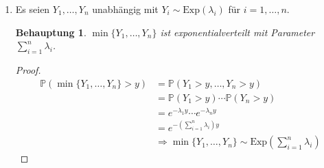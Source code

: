\documentclass[a4paper]{scrartcl}
\newtheorem*{behaupt}{Behauptung}
\newcommand{\prob}{\mathbb{P}}
\def \blattnr {4}
\begin{document}
\begin{enumerate}[label=\bfseries \blattnr.\arabic*]
\begin{enumerate}
            \item
                Es seien $Y_1, \dotsc, Y_n$ unabhängig mit $Y_i \sim
                \text{Exp}(\lambda_i)$ für $i = 1, \dotsc, n$.
                \begin{behaupt}
                    $\min\{Y_1, \dotsc, Y_n\}$ ist exponentialverteilt mit
                    Parameter $\sum_{i=1}^n \lambda_i$.
                \end{behaupt}
                \begin{proof}
                    \begin{equation*}
                        \begin{split}
                            \prob(\min\{Y_1, \dotsc, Y_n\} > y)
                            &= \prob(Y_1 > y, \dotsc, Y_n > y) \\
                            &= \prob(Y_1 > y) \dotsm \prob(Y_n > y) \\
                            &= e^{-\lambda_1 y} \dotsm e^{-\lambda_n y} \\
                            &= e^{- \left( \sum_{i=1}^n \lambda_i \right) y} \\
                            &\Rightarrow \min\{Y_1, \dotsc, Y_n\} \sim
                            \text{Exp} \left( \sum_{i=1}^n \lambda_i \right)
                        \end{split}
                    \end{equation*}
                \end{proof}


\end{enumerate}
\end{enumerate}
\end{document}
